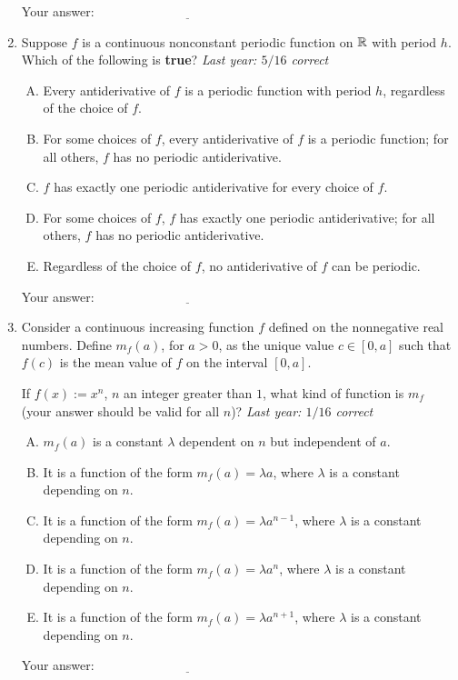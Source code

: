 \documentclass[10pt]{amsart}
\begin{document}
\begin{enumerate}
  \vspace{0.1in}
  Your answer: $\underline{\qquad\qquad\qquad\qquad\qquad\qquad\qquad}$
  \vspace{0.6in}

\item Suppose $f$ is a continuous nonconstant periodic function on
  $\mathbb{R}$ with period $h$. Which of the following is {\bf true}? {\em
  Last year: $5/16$ correct}

  \begin{enumerate}[(A)]
  \item Every antiderivative of $f$ is a periodic function with period
    $h$, regardless of the choice of $f$.
  \item For some choices of $f$, every antiderivative of $f$ is a
    periodic function; for all others, $f$ has no periodic antiderivative.
  \item $f$ has exactly one periodic antiderivative for every choice of $f$.
  \item For some choices of $f$, $f$ has exactly one periodic
    antiderivative; for all others, $f$ has no periodic
    antiderivative.
  \item Regardless of the choice of $f$, no antiderivative of $f$ can
    be periodic.
  \end{enumerate}

  \vspace{0.1in}
  Your answer: $\underline{\qquad\qquad\qquad\qquad\qquad\qquad\qquad}$
  \vspace{0.6in}

\item Consider a continuous increasing
  function $f$ defined on the nonnegative real numbers. Define $m_f(a)$,
  for $a > 0$, as the unique value $c \in [0,a]$ such that $f(c)$ is the
  mean value of $f$ on the interval $[0,a]$.
  
  If $f(x) := x^n$, $n$ an integer greater than $1$, what kind of
  function is $m_f$ (your answer should be valid for all $n$)? {\em
  Last year: $1/16$ correct}

  \begin{enumerate}[(A)]
  \item $m_f(a)$ is a constant $\lambda$ dependent on $n$ but
    independent of $a$.
  \item It is a function of the form $m_f(a) = \lambda a$, where
    $\lambda$ is a constant depending on $n$.
  \item It is a function of the form $m_f(a) = \lambda a^{n-1}$, where
    $\lambda$ is a constant depending on $n$.
  \item It is a function of the form $m_f(a) = \lambda a^n$, where
    $\lambda$ is a constant depending on $n$.
  \item It is a function of the form $m_f(a) = \lambda a^{n+1}$, where
    $\lambda$ is a constant depending on $n$.
  \end{enumerate}

  \vspace{0.1in}
  Your answer: $\underline{\qquad\qquad\qquad\qquad\qquad\qquad\qquad}$
  \vspace{0.6in}

\end{enumerate}
\end{document}
